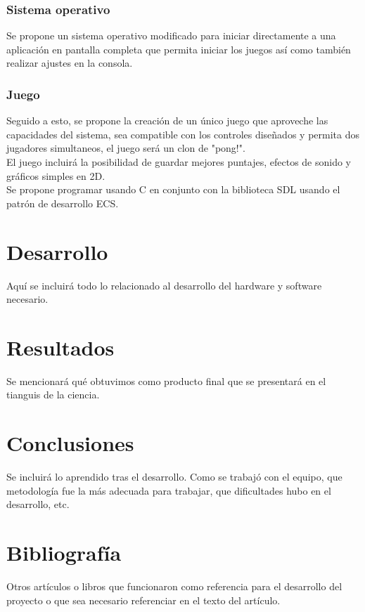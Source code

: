 \documentclass[letterpaper]{article}
\begin{document}
\begin{multicols}{2}
\subsubsection{Sistema operativo}
Se propone un sistema operativo modificado para iniciar directamente a una
aplicación en pantalla completa que permita iniciar los juegos así como también
realizar ajustes en la consola.


\subsubsection{Juego}
Seguido a esto, se propone la creación de un único juego que aproveche las
capacidades del sistema, sea compatible con los controles diseñados y permita
dos jugadores simultaneos, el juego será un clon de "pong!".\\
El juego incluirá la posibilidad de guardar mejores puntajes, efectos de sonido
y gráficos simples en 2D.\\
Se propone programar usando C en conjunto con la biblioteca SDL usando el patrón
de desarrollo ECS.

\section{Desarrollo}
Aquí se incluirá todo lo relacionado al desarrollo del hardware y software
necesario.

\section{Resultados}
Se mencionará qué obtuvimos como producto final que se presentará en el tianguis
de la ciencia.

\section{Conclusiones}
Se incluirá lo aprendido tras el desarrollo. Como se trabajó con el equipo, que
metodología fue la más adecuada para trabajar, que dificultades hubo en el
desarrollo, etc.

\section{Bibliografía}
Otros artículos o libros que funcionaron como referencia para el desarrollo del
proyecto o que sea necesario referenciar en el texto del artículo.

\end{multicols}
\end{document}
